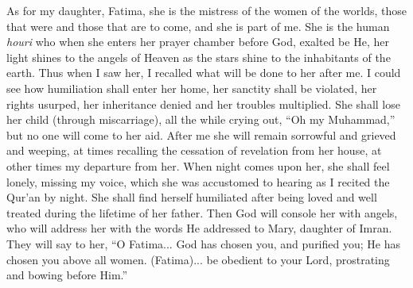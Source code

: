 \begin{quotex}
As for my daughter, Fatima, she is the mistress of the women of the worlds, those that were and those that are to come, and she is part of me. She is the human \emph{houri} who when she enters her prayer chamber before God, exalted be He, her light shines to the angels of Heaven as the stars shine to the inhabitants of the earth. Thus when I saw her, I recalled what will be done to her after me. I could see how humiliation shall enter her home, her sanctity shall be violated, her rights usurped, her inheritance denied and her troubles multiplied. She shall lose her child (through miscarriage), all the while crying out, ``Oh my Muhammad,'' but no one will come to her aid. After me she will remain sorrowful and grieved and weeping, at times recalling the cessation of revelation from her house, at other times my departure from her. When night comes upon her, she shall feel lonely, missing my voice, which she was accustomed to hearing as I recited the Qur'an by night. She shall find herself humiliated after being loved and well treated during the lifetime of her father. Then God will console her with angels, who will address her with the words He addressed to Mary, daughter of Imran. They will say to her, ``O Fatima... God has chosen you, and purified you; He has chosen you above all women. (Fatima)... be obedient to your Lord, prostrating and bowing before Him.''


\end{quotex}
